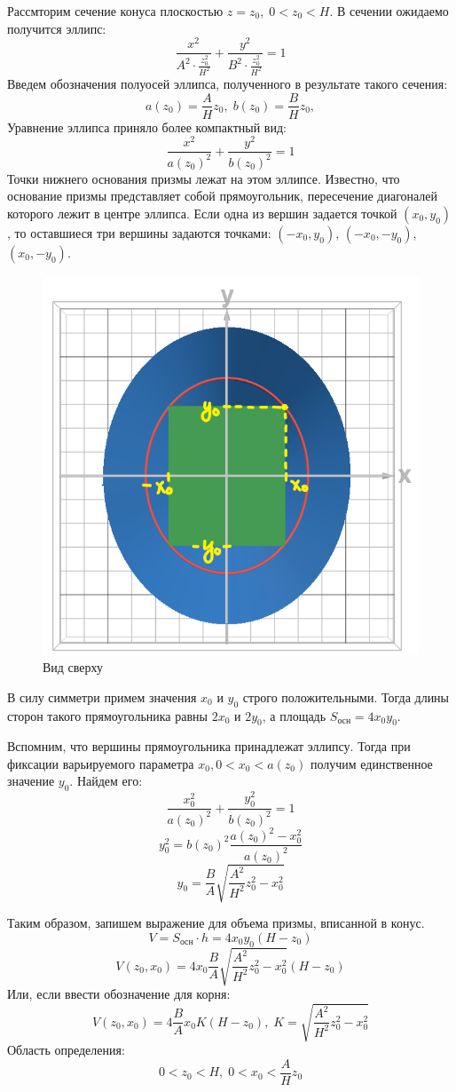 \documentclass{article}
\begin{document}
Рассмторим сечение конуса плоскостью $z = z_0, \; 0 < z_0 < H$. В сечении ожидаемо получится эллипс:
$$
\frac{x^2}{A^2 \cdot \frac{z_0^2}{H^2}} + \frac{y^2}{B^2 \cdot \frac{z_0^2}{H^2}} = 1
$$
Введем обозначения полуосей эллипса, полученного в результате такого сечения:
$$
a(z_0) =  \frac{A}{H} z_0, \; b(z_0) =  \frac{B}{H} z_0,
$$
Уравнение эллипса приняло более компактный вид:
$$
\frac{x^2}{a(z_0)^2} + \frac{y^2}{b(z_0)^2} = 1
$$
Точки нижнего основания призмы лежат на этом эллипсе. Известно, что основание призмы представляет собой прямоугольник, пересечение диагоналей которого лежит в центре эллипса. Если одна из вершин задается точкой $(x_0, y_0)$, то оставшиеся три вершины задаются точками: $(-x_0, y_0)$, $(-x_0, -y_0)$, $(x_0, -y_0)$.
\begin{figure}[H]
    \begin{center}
        \includegraphics[width=.5\textwidth]{up.png}
    \end{center}
\caption{Вид сверху}
\end{figure}
В силу симметри примем значения $x_0$ и $y_0$ строго положительными. Тогда длины сторон такого прямоугольника равны $2x_0$ и $2y_0$, а площадь $S_{\text{осн}} = 4x_0y_0$.

Вспомним, что вершины прямоугольника принадлежат эллипсу. Тогда при фиксации варьируемого параметра $x_0, 0 < x_0 < a(z_0)$ получим единственное значение $y_0$. Найдем его:
$$
\frac{x_0^2}{a(z_0)^2} + \frac{y_0^2}{b(z_0)^2} = 1
$$
$$
y_0^2 = b(z_0)^2 \frac{a(z_0)^2 - x_0^2}{a(z_0)^2}
$$
$$
y_0 = \frac{B}{A} \sqrt{\frac{A^2}{H^2} z_0^2 - x_0^2} 
$$

Таким образом, запишем выражение для объема призмы, вписанной в конус.
$$
V = S_{\text{осн}} \cdot h = 4x_0y_0(H-z_0)
$$
$$
V(z_0, x_0) = 4x_0\frac{B}{A} \sqrt{\frac{A^2}{H^2} z_0^2 - x_0^2} (H - z_0)
$$
Или, если ввести обозначение для корня:
$$
V(z_0, x_0) = 4\frac{B}{A} x_0 K (H - z_0), \; K = \sqrt{\frac{A^2}{H^2} z_0^2 - x_0^2}
$$
Область определения: 
$$
0 < z_0 < H, \; 0 < x_0 < \frac{A}{H}z_0
$$
\end{document}
